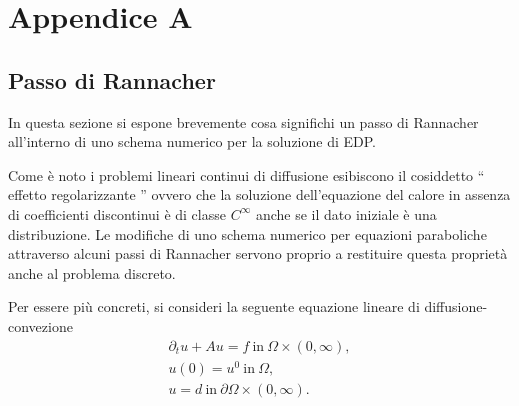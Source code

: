 \section{Appendice A}
\label{ranna}
\subsection{Passo di Rannacher}
In questa sezione si espone brevemente cosa significhi un passo di Rannacher all'interno di uno schema numerico per la soluzione di EDP.

Come è noto i problemi lineari continui di diffusione esibiscono il cosiddetto `` effetto regolarizzante '' ovvero che la soluzione dell'equazione del calore in assenza di coefficienti discontinui è di classe $ C^{\infty} $ anche se il dato iniziale è una distribuzione. Le modifiche di uno schema numerico per equazioni paraboliche attraverso alcuni passi di Rannacher servono proprio a restituire questa proprietà anche al problema discreto.

Per essere più concreti, si consideri la seguente equazione lineare di diffusione-convezione
\begin{gather}
\label{heat}
\partial_t u + Au=f \ \text{in}\ \Omega\times(0,\infty),  \\
u(0)=u^0 \ \text{in}\ \Omega, \\
u=d \ \text{in} \ \partial\Omega\times (0,\infty).
\end{gather}

